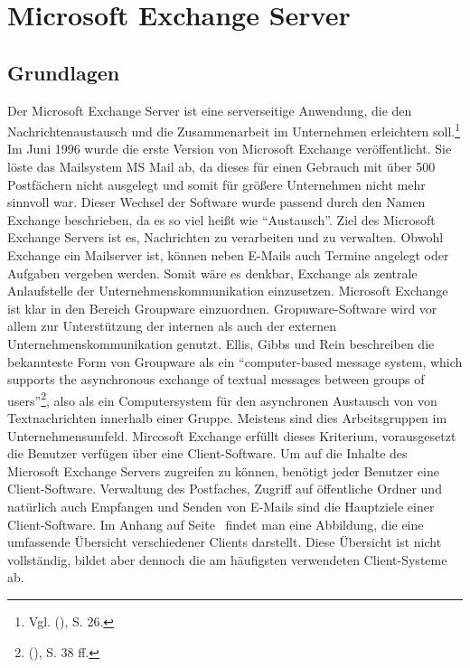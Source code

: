 \section{Microsoft Exchange Server}

\subsection{Grundlagen}
\noindent 
Der  Microsoft Exchange Server ist eine serverseitige Anwendung, die den Nachrichtenaustausch und die Zusammenarbeit im Unternehmen erleichtern soll.\footnote{Vgl. \citeauthor{Joos} (\citeyear{Joos}), S. 26.} Im Juni 1996 wurde die erste Version von Microsoft Exchange veröffentlicht. Sie löste das Mailsystem MS Mail ab, da dieses für einen Gebrauch mit über 500 Postfächern nicht ausgelegt und somit für größere Unternehmen nicht mehr sinnvoll war. Dieser Wechsel der Software wurde passend durch den Namen Exchange beschrieben, da es so viel heißt wie \enquote{Austausch}. Ziel des Microsoft Exchange Servers ist es, Nachrichten zu verarbeiten und zu verwalten. Obwohl Exchange ein Mailserver ist, können neben E-Mails auch Termine angelegt oder Aufgaben vergeben werden. Somit wäre es denkbar, Exchange als zentrale Anlaufstelle der Unternehmenskommunikation einzusetzen.\newline
Microsoft Exchange ist klar in den Bereich Groupware einzuordnen. Gropuware-Software wird vor allem zur Unterstützung der internen als auch der externen Unternehmenskommunikation genutzt. Ellis, Gibbs und Rein beschreiben die bekannteste Form von Groupware als ein 
\enquote{computer-based message system, which supports the asynchronous exchange of textual messages between groups of users}\footnote{\citeauthor{Ellis} (\citeyear{Ellis}), S. 38 ff.}, also als ein Computersystem für den asynchronen Austausch von von Textnachrichten innerhalb einer Gruppe. Meistens sind dies Arbeitsgruppen im Unternehmensumfeld. Mircosoft Exchange erfüllt dieses Kriterium, vorausgesetzt die Benutzer verfügen über eine Client-Software.\newline
Um auf die Inhalte des Microsoft Exchange Servers zugreifen zu können, benötigt jeder Benutzer eine Client-Software. Verwaltung des Postfaches, Zugriff auf öffentliche Ordner und natürlich auch Empfangen und Senden von E-Mails sind die Hauptziele einer Client-Software. Im Anhang auf Seite~\pageref{Exchange_Verbindungen} findet man eine Abbildung, die eine umfassende Übersicht verschiedener Clients darstellt. Diese Übersicht ist nicht vollständig, bildet aber dennoch die am häufigsten verwendeten Client-Systeme ab.\newline
